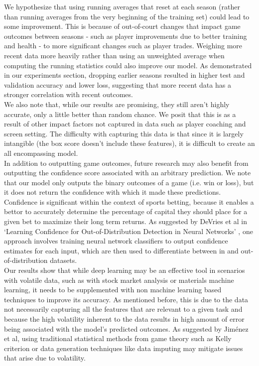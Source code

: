 \documentclass[10pt,twocolumn,letterpaper]{article}
\begin{document}
We hypothesize that using running averages that reset at each season (rather than running averages from the very beginning of the training set) could lead to some improvement. This is because of out-of-court changes that impact game outcomes between seasons - such as player improvements due to better training and health - to more significant changes such as player trades. Weighing more recent data more heavily rather than using an unweighted average when computing the running statistics could also improve our model. As demonstrated in our experiments section, dropping earlier seasons resulted in higher test and validation accuracy and lower loss, suggesting that more recent data has a stronger correlation with recent outcomes. \\

We also note that, while our results are promising, they still aren't highly accurate, only a little better than random chance. We posit that this is as a result of other impact factors not captured in data such as player coaching and screen setting. The difficulty with capturing this data is that since it is largely intangible (the box score doesn't include these features), it is difficult to create an all encompassing model. \\

In addition to outputting game outcomes, future research may also benefit from outputting the confidence score associated with an arbitrary prediction. We note that our model only outputs the binary outcomes of a game (i.e. win or loss), but it does not return the confidence with which it made these predictions. Confidence is significant within the context of sports betting, because it enables a bettor to accurately determine the percentage of capital they should place for a given bet to maximize their long term returns. As suggested by DeVries et al in `Learning Confidence for Out-of-Distribution Detection in Neural Networks' \cite{Confidence}, one approach involves training neural network classifiers to output confidence estimates for each input, which are then used to differentiate between in and out-of-distribution datasets. \\ 

Our results show that while deep learning may be an effective tool in scenarios with volatile data, such as with stock market analysis or materials machine learning, it needs to be supplemented with non machine learning based techniques to improve its accuracy. As mentioned before, this is due to the data not necessarily capturing all the features that are relevant to a given task and because the high volatility inherent to the data results in high amount of error being associated with the model's predicted outcomes. As suggested by Jiménez et al\cite{Jiménez}, using traditional statistical methods from game theory such as Kelly criterion or data generation techniques like data imputing may mitigate issues that arise due to volatility. \\
\end{document}
